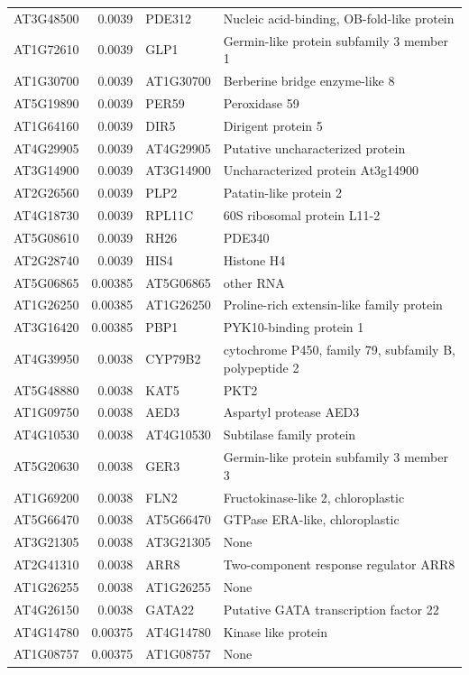 \documentclass[11pt]{article}
\begin{document}
\begin{center}
\begin{tabular}{lrll}
AT3G48500 & 0.0039 & PDE312 & Nucleic acid-binding, OB-fold-like protein\\
AT1G72610 & 0.0039 & GLP1 & Germin-like protein subfamily 3 member 1\\
AT1G30700 & 0.0039 & AT1G30700 & Berberine bridge enzyme-like 8\\
AT5G19890 & 0.0039 & PER59 & Peroxidase 59\\
AT1G64160 & 0.0039 & DIR5 & Dirigent protein 5\\
AT4G29905 & 0.0039 & AT4G29905 & Putative uncharacterized protein\\
AT3G14900 & 0.0039 & AT3G14900 & Uncharacterized protein At3g14900\\
AT2G26560 & 0.0039 & PLP2 & Patatin-like protein 2\\
AT4G18730 & 0.0039 & RPL11C & 60S ribosomal protein L11-2\\
AT5G08610 & 0.0039 & RH26 & PDE340\\
AT2G28740 & 0.0039 & HIS4 & Histone H4\\
AT5G06865 & 0.00385 & AT5G06865 & other RNA\\
AT1G26250 & 0.00385 & AT1G26250 & Proline-rich extensin-like family protein\\
AT3G16420 & 0.00385 & PBP1 & PYK10-binding protein 1\\
AT4G39950 & 0.0038 & CYP79B2 & cytochrome P450, family 79, subfamily B, polypeptide 2\\
AT5G48880 & 0.0038 & KAT5 & PKT2\\
AT1G09750 & 0.0038 & AED3 & Aspartyl protease AED3\\
AT4G10530 & 0.0038 & AT4G10530 & Subtilase family protein\\
AT5G20630 & 0.0038 & GER3 & Germin-like protein subfamily 3 member 3\\
AT1G69200 & 0.0038 & FLN2 & Fructokinase-like 2, chloroplastic\\
AT5G66470 & 0.0038 & AT5G66470 & GTPase ERA-like, chloroplastic\\
AT3G21305 & 0.0038 & AT3G21305 & None\\
AT2G41310 & 0.0038 & ARR8 & Two-component response regulator ARR8\\
AT1G26255 & 0.0038 & AT1G26255 & None\\
AT4G26150 & 0.0038 & GATA22 & Putative GATA transcription factor 22\\
AT4G14780 & 0.00375 & AT4G14780 & Kinase like protein\\
AT1G08757 & 0.00375 & AT1G08757 & None\\

\end{tabular}
\end{center}
\end{document}
